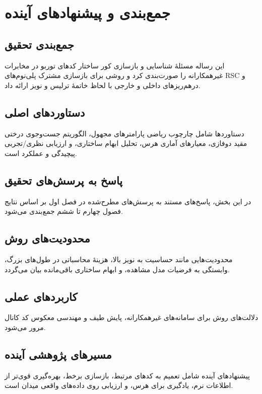 \chapter{جمع‌بندی و پیشنهادهای آینده}
\label{chap:conclusion}

\section{جمع‌بندی تحقیق}
این رساله مسئلهٔ شناسایی و بازسازی کور ساختار کدهای توربو در مخابرات غیرهمکارانه را صورت‌بندی کرد و روشی برای بازسازی مشترک پلی‌نوم‌های RSC و درهم‌ریزهای داخلی و خارجی با لحاظ خاتمهٔ ترلیس و نویز ارائه داد.

\section{دستاوردهای اصلی}
دستاوردها شامل چارچوب ریاضی پارامترهای مجهول، الگوریتم جست‌وجوی درختی مقید دوفازی، معیارهای آماری هرس، تحلیل ابهام ساختاری، و ارزیابی نظری/تجربی پیچیدگی و عملکرد است.

\section{پاسخ به پرسش‌های تحقیق}
در این بخش، پاسخ‌های مستند به پرسش‌های مطرح‌شده در فصل اول بر اساس نتایج فصول چهارم تا ششم جمع‌بندی می‌شود.

\section{محدودیت‌های روش}
محدودیت‌هایی مانند حساسیت به نویز بالا، هزینهٔ محاسباتی در طول‌های بزرگ، وابستگی به فرضیات مدل مشاهده، و ابهام ساختاری باقی‌مانده بیان می‌گردد.

\section{کاربردهای عملی}
دلالت‌های روش برای سامانه‌های غیرهمکارانه، پایش طیف و مهندسی معکوس کد کانال مرور می‌شود.

\section{مسیرهای پژوهشی آینده}
پیشنهادهای آینده شامل تعمیم به کدهای مرتبط، بازسازی برخط، بهره‌گیری قوی‌تر از اطلاعات نرم، یادگیری برای هرس، و ارزیابی روی داده‌های واقعی میدان است.
